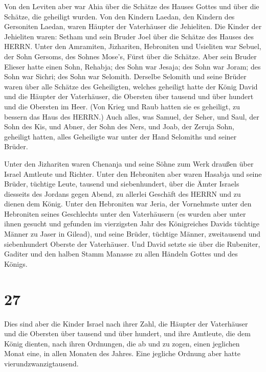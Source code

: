  Von den Leviten aber war Ahia über die Schätze des Hauses
Gottes und über die Schätze, die geheiligt wurden.  Von den
Kindern Laedan, den Kindern des Gersoniten Laedan, waren Häupter der
Vaterhäuser die Jehieliten.  Die Kinder der Jehieliten
waren: Setham und sein Bruder Joel über die Schätze des Hauses des
HERRN.  Unter den Amramiten, Jizhariten, Hebroniten und
Usieliten  war Sebuel, der Sohn Gersoms, des Sohnes Mose's,
Fürst über die Schätze.  Aber sein Bruder Elieser hatte
einen Sohn, Rehabja; des Sohn war Jesaja; des Sohn war Joram; des Sohn
war Sichri; des Sohn war Selomith.  Derselbe Selomith und
seine Brüder waren über alle Schätze des Geheiligten, welches geheiligt
hatte der König David und die Häupter der Vaterhäuser, die Obersten über
tausend und über hundert und die Obersten im Heer.  (Von
Krieg und Raub hatten sie es geheiligt, zu bessern das Haus des HERRN.)
 Auch alles, was Samuel, der Seher, und Saul, der Sohn des
Kis, und Abner, der Sohn des Ners, und Joab, der Zeruja Sohn, geheiligt
hatten, alles Geheiligte war unter der Hand Selomiths und seiner Brüder.

 Unter den Jizhariten waren Chenanja und seine Söhne zum
Werk draußen über Israel Amtleute und Richter.  Unter den
Hebroniten aber waren Hasabja und seine Brüder, tüchtige Leute, tausend
und siebenhundert, über die Ämter Israels diesseits des Jordans gegen
Abend, zu allerlei Geschäft des HERRN und zu dienen dem König.
 Unter den Hebroniten war Jeria, der Vornehmste unter den
Hebroniten seines Geschlechts unter den Vaterhäusern (es wurden aber
unter ihnen gesucht und gefunden im vierzigsten Jahr des Königreiches
Davids tüchtige Männer zu Jaser in Gilead),  und seine
Brüder, tüchtige Männer, zweitausend und siebenhundert Oberste der
Vaterhäuser. Und David setzte sie über die Rubeniter, Gaditer und den
halben Stamm Manasse zu allen Händeln Gottes und des Königs.

\hypertarget{section-26}{%
\section{27}\label{section-26}}

 Dies sind aber die Kinder Israel nach ihrer Zahl, die
Häupter der Vaterhäuser und die Obersten über tausend und über hundert,
und ihre Amtleute, die dem König dienten, nach ihren Ordnungen, die ab
und zu zogen, einen jeglichen Monat eine, in allen Monaten des Jahres.
Eine jegliche Ordnung aber hatte vierundzwanzigtausend.

